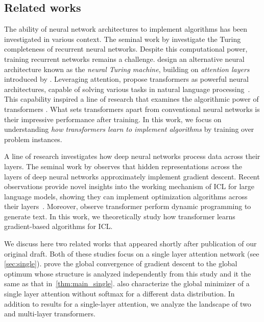 \documentclass{article}
\begin{document}


\subsection{Related works}  


The ability of neural network architectures to implement algorithms has been investigated in various context. The seminal work by \cite{siegelmann1992computational} investigate the Turing completeness of recurrent neural networks. Despite this computational power, training recurrent networks remains a challenge.  \cite{graves2014neural} design an alternative neural architecture known as the \emph{neural Turing machine}, building on \emph{attention layers} introduced by \cite{hochreiter1997long}. Leveraging attention, \cite{vaswani2017attention} propose transformers as powerful neural architectures, capable of solving various tasks in natural language processing~\citep{bert}. This capability inspired a line of research that examines the algorithmic power of transformers \citep{perez2021attention,wei2022statistically,giannou2023looped,akyurek2022learning,olsson2022context}.    What sets transformers apart from conventional neural networks is their impressive performance after training. In this work, we focus on understanding \emph{how transformers learn to implement algorithms} by training over problem instances.


A line of research investigates how deep neural networks process data across their layers. The seminal work by \cite{jastrzebski2018residual} observes that hidden representations across the layers of deep neural  networks approximately implement gradient descent.  
Recent observations provide novel insights into the working mechanism of ICL for large language models, showing they can implement optimization algorithms across their layers~\citep{garg2022can,akyurek2022learning,von2022transformers}. Moreover, \citet{zhao2023transformers,allen2023physics} observe transformer perform dynamic programming to generate text.  
In this work, we theoretically study how transformer learns gradient-based algorithms for ICL.


 We discuss here two related works \citep{zhang2023trained,mahankali2023one} that appeared shortly after publication of our original draft. Both of these studies focus on a single layer attention network (see  \autoref{sec:single}). \cite{zhang2023trained} prove the global convergence of gradient descent to the global optimum whose structure is analyzed independently from this study and it the same as that in~\autoref{thm:main_single}. \cite{mahankali2023one} also characterize the global minimizer of a single layer attention without softmax for a different data distribution. In addition to results for a single-layer attention, we analyze the landscape of two and multi-layer transformers. 
 
\end{document}
